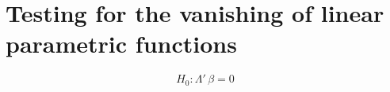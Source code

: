 \documentclass{article}
\begin{document}

\section{Testing for the vanishing of linear parametric functions}
\setcounter{theorem}{0}

\begin{equation*}
H_{0}: \Lambda'\,\beta = 0
\end{equation*}



\appendix



%
%
%



\end{document}
